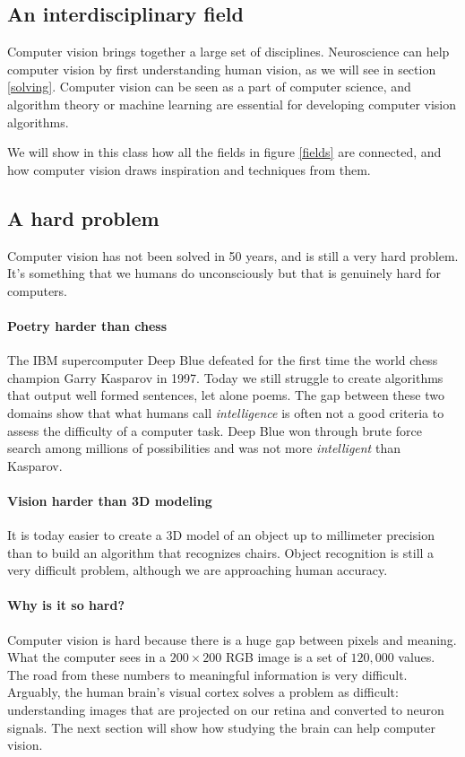 \documentclass{article}
\begin{document}
\subsection{An interdisciplinary field}

Computer vision brings together a large set of disciplines. Neuroscience can help computer vision by first understanding human vision, as we will see in section \ref{solving}. Computer vision can be seen as a part of computer science, and algorithm theory or machine learning are essential for developing computer vision algorithms.

We will show in this class how all the fields in figure \ref{fields} are connected, and how computer vision draws inspiration and techniques from them.

\subsection{A hard problem}

Computer vision has not been solved in 50 years, and is still a very hard problem. It's something that we humans do unconsciously but that is genuinely hard for computers.

\paragraph{Poetry harder than chess}
The IBM supercomputer Deep Blue defeated for the first time the world chess champion Garry Kasparov in 1997. Today we still struggle to create algorithms that output well formed sentences, let alone poems.
The gap between these two domains show that what humans call \textit{intelligence} is often not a good criteria to assess the difficulty of a computer task. Deep Blue won through brute force search among millions of possibilities and was not more \textit{intelligent} than Kasparov.

\paragraph{Vision harder than 3D modeling}
It is today easier to create a 3D model of an object up to millimeter precision than to build an algorithm that recognizes chairs. Object recognition is still a very difficult problem, although we are approaching human accuracy.

\paragraph{Why is it so hard?}
Computer vision is hard because there is a huge gap between pixels and meaning. What the computer sees in a $200 \times 200$ RGB image is a set of $120,000$ values. The road from these numbers to meaningful information is very difficult. Arguably, the human brain's visual cortex solves a problem as difficult: understanding images that are projected on our retina and converted to neuron signals. The next section will show how studying the brain can help computer vision.
\end{document}
